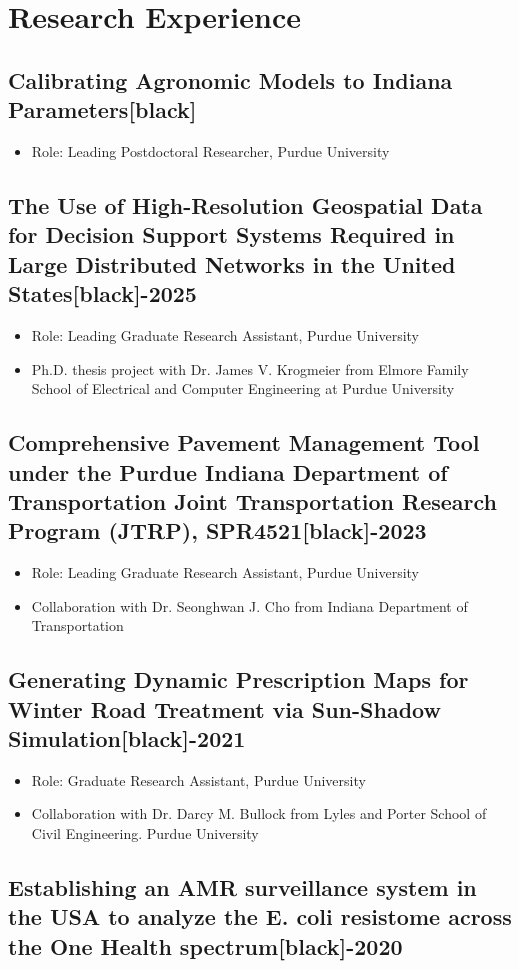 \documentclass[10pt]{article}
\newcommand{\subsectiondate}[2]{%
  \subsection*{%
    #1\enspace\xdotfill[.5ex]{1pt}[black]\enspace #2%
  }%
}
\begin{document}
\section{Research Experience}
\subsectiondate{Calibrating Agronomic Models to Indiana Parameters}{2026}
\begin{itemize}[label=-, labelindent=1.5em, leftmargin=2.5em, labelsep=0.6 em, itemsep =0pt, topsep=0pt]
    \item[-] Role: Leading Postdoctoral Researcher, Purdue University
\end{itemize}
\subsectiondate{The Use of High-Resolution Geospatial Data for Decision Support Systems Required in Large Distributed Networks in the United States}{2022-2025}
\begin{itemize}[label=-, labelindent=1.5em, leftmargin=2.5em, labelsep=0.6 em, itemsep =0pt, topsep=0pt]
    \item[-] Role: Leading Graduate Research Assistant, Purdue University
    \item[-] Ph.D. thesis project with Dr. James V. Krogmeier from Elmore Family School of Electrical and Computer Engineering at Purdue University
    
\end{itemize}
\subsectiondate{Comprehensive Pavement Management Tool under the Purdue Indiana Department of Transportation Joint Transportation Research Program (JTRP), SPR4521}{2021-2023}
\begin{itemize}[label=-, labelindent=1.5em, leftmargin=2.5em, labelsep=0.6 em, itemsep =0pt, topsep=0pt]
    \item[-] Role: Leading Graduate Research Assistant, Purdue University
    \item[-] Collaboration with Dr. Seonghwan J. Cho from Indiana Department of Transportation
    
\end{itemize}
\subsectiondate{Generating Dynamic Prescription Maps for Winter Road Treatment via Sun-Shadow Simulation}{2020-2021}
\begin{itemize}[label=-, labelindent=1.5em, leftmargin=2.5em, labelsep=0.6 em, itemsep =0pt, topsep=0pt]
    \item[-] Role: Graduate Research Assistant, Purdue University
    \item[-] Collaboration with Dr. Darcy M. Bullock from Lyles and Porter School of Civil Engineering. Purdue University 
    
\end{itemize}
\subsectiondate{Establishing an AMR surveillance system in the USA to analyze the E. coli resistome across the One Health
spectrum}{2018-2020}
\end{document}
